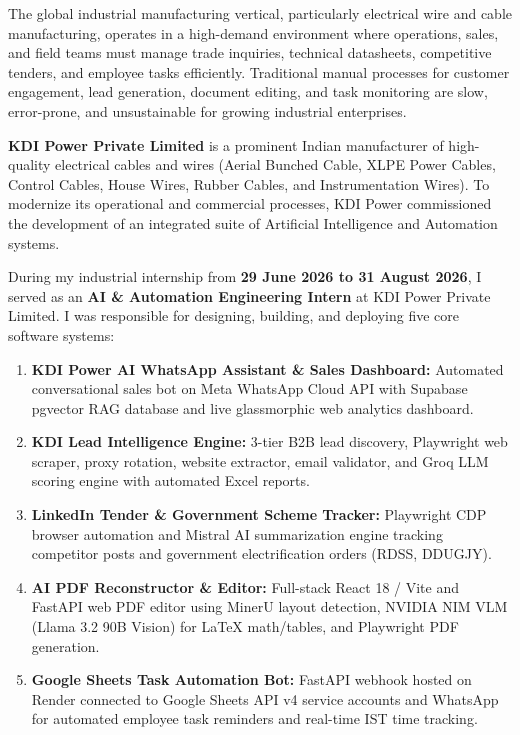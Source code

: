 \documentclass[12pt,a4paper]{report}
\begin{document}
The global industrial manufacturing vertical, particularly electrical wire and cable manufacturing, operates in a high-demand environment where operations, sales, and field teams must manage trade inquiries, technical datasheets, competitive tenders, and employee tasks efficiently. Traditional manual processes for customer engagement, lead generation, document editing, and task monitoring are slow, error-prone, and unsustainable for growing industrial enterprises.

\textbf{KDI Power Private Limited} is a prominent Indian manufacturer of high-quality electrical cables and wires (Aerial Bunched Cable, XLPE Power Cables, Control Cables, House Wires, Rubber Cables, and Instrumentation Wires). To modernize its operational and commercial processes, KDI Power commissioned the development of an integrated suite of Artificial Intelligence and Automation systems.

During my industrial internship from \textbf{29 June 2026 to 31 August 2026}, I served as an \textbf{AI \& Automation Engineering Intern} at KDI Power Private Limited. I was responsible for designing, building, and deploying five core software systems:
\begin{enumerate}[leftmargin=*,itemsep=2pt]
    \item \textbf{KDI Power AI WhatsApp Assistant \& Sales Dashboard:} Automated conversational sales bot on Meta WhatsApp Cloud API with Supabase pgvector RAG database and live glassmorphic web analytics dashboard.
    \item \textbf{KDI Lead Intelligence Engine:} 3-tier B2B lead discovery, Playwright web scraper, proxy rotation, website extractor, email validator, and Groq LLM scoring engine with automated Excel reports.
    \item \textbf{LinkedIn Tender \& Government Scheme Tracker:} Playwright CDP browser automation and Mistral AI summarization engine tracking competitor posts and government electrification orders (RDSS, DDUGJY).
    \item \textbf{AI PDF Reconstructor \& Editor:} Full-stack React 18 / Vite and FastAPI web PDF editor using MinerU layout detection, NVIDIA NIM VLM (Llama 3.2 90B Vision) for LaTeX math/tables, and Playwright PDF generation.
    \item \textbf{Google Sheets Task Automation Bot:} FastAPI webhook hosted on Render connected to Google Sheets API v4 service accounts and WhatsApp for automated employee task reminders and real-time IST time tracking.
\end{enumerate}
\end{document}

